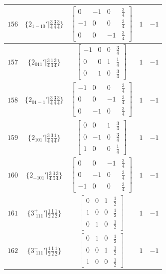 \documentclass[fleqn,8pt]{jsarticle}
\begin{document}
\begin{longtable}{ccccc}
$ 156 $ & $ \{2{}_{1-10}{}'|\frac{3}{4} \frac{3}{4} \frac{3}{4}\} $ & $ \begin{bmatrix} 0 & -1 & 0 & \frac{3}{4} \\ -1 & 0 & 0 & \frac{3}{4} \\ 0 & 0 & -1 & \frac{3}{4} \end{bmatrix} $ & $ 1 $ & $ -1 $ \\ \hline
$ 157 $ & $ \{2{}_{011}{}'|\frac{3}{4} \frac{1}{4} \frac{3}{4}\} $ & $ \begin{bmatrix} -1 & 0 & 0 & \frac{3}{4} \\ 0 & 0 & 1 & \frac{1}{4} \\ 0 & 1 & 0 & \frac{3}{4} \end{bmatrix} $ & $ 1 $ & $ -1 $ \\ \hline
$ 158 $ & $ \{2{}_{01-1}{}'|\frac{3}{4} \frac{3}{4} \frac{3}{4}\} $ & $ \begin{bmatrix} -1 & 0 & 0 & \frac{3}{4} \\ 0 & 0 & -1 & \frac{3}{4} \\ 0 & -1 & 0 & \frac{3}{4} \end{bmatrix} $ & $ 1 $ & $ -1 $ \\ \hline
$ 159 $ & $ \{2{}_{101}{}'|\frac{3}{4} \frac{3}{4} \frac{1}{4}\} $ & $ \begin{bmatrix} 0 & 0 & 1 & \frac{3}{4} \\ 0 & -1 & 0 & \frac{3}{4} \\ 1 & 0 & 0 & \frac{1}{4} \end{bmatrix} $ & $ 1 $ & $ -1 $ \\ \hline
$ 160 $ & $ \{2{}_{-101}{}'|\frac{3}{4} \frac{3}{4} \frac{3}{4}\} $ & $ \begin{bmatrix} 0 & 0 & -1 & \frac{3}{4} \\ 0 & -1 & 0 & \frac{3}{4} \\ -1 & 0 & 0 & \frac{3}{4} \end{bmatrix} $ & $ 1 $ & $ -1 $ \\ \hline
$ 161 $ & $ \{3^{+}_{\,\,111}{}'|\frac{1}{2} \frac{1}{2} \frac{1}{2}\} $ & $ \begin{bmatrix} 0 & 0 & 1 & \frac{1}{2} \\ 1 & 0 & 0 & \frac{1}{2} \\ 0 & 1 & 0 & \frac{1}{2} \end{bmatrix} $ & $ 1 $ & $ -1 $ \\ \hline
$ 162 $ & $ \{3^{-}_{\,\,111}{}'|\frac{1}{2} \frac{1}{2} \frac{1}{2}\} $ & $ \begin{bmatrix} 0 & 1 & 0 & \frac{1}{2} \\ 0 & 0 & 1 & \frac{1}{2} \\ 1 & 0 & 0 & \frac{1}{2} \end{bmatrix} $ & $ 1 $ & $ -1 $ \\ \hline

\end{longtable}
\end{document}

